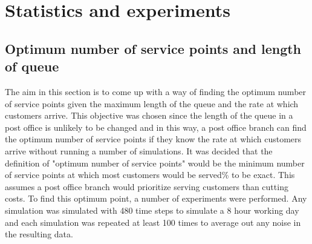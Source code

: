 \documentclass{article}
\begin{document}
\section{Statistics and experiments}
\subsection{Optimum number of service points and length of queue}
The aim in this section is to come up with a way of finding the optimum number of service points given the maximum length of the queue and the rate at which customers arrive. This objective was chosen since the length of the queue in a post office is unlikely to be changed and in this way, a post office branch can find the optimum number of service points if they know the rate at which customers arrive without running a number of simulations.
It was decided that the definition of "optimum number of service points" would be the minimum number of service points at which most customers would be served\% to be exact. This assumes a post office branch would prioritize serving customers than cutting costs.
To find this optimum point, a number of experiments were performed. Any simulation was simulated with 480 time steps to simulate a 8 hour working day and each simulation was repeated at least 100 times to average out any noise in the resulting data.
\end{document}
